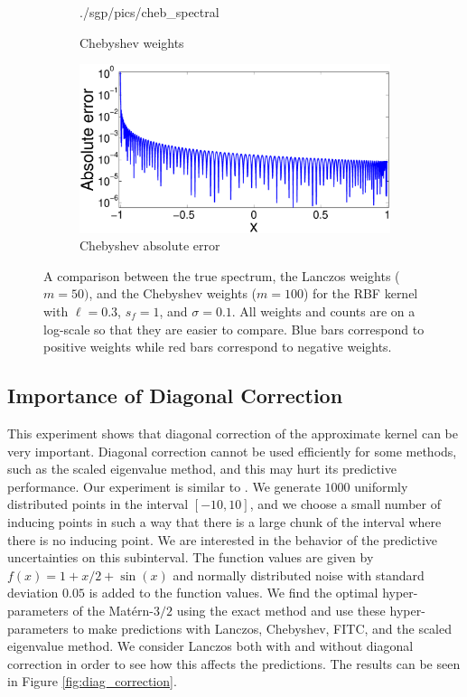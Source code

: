\begin{figure}[ht]
\begin{center}
\begin{subfigure}{0.46\textwidth}
      {./sgp/pics/cheb_spectral}
      \caption{Chebyshev weights}
      \label{fig:cheb_spectral}
    \end{subfigure}
    \begin{subfigure}{0.46\textwidth}
      \centering
      \includegraphics[width=\textwidth,trim=0cm 0cm 2.5cm 0.5cm,clip]
      {./sgp/pics/cheb_err}
      \caption{Chebyshev absolute error}
      \label{fig:cheb_err}
    \end{subfigure}
    \caption{A comparison between the true spectrum, the Lanczos weights 
    ($m=50)$, and the Chebyshev weights ($m=100$) for the RBF kernel with
    $\ell=0.3$, $s_f=1$, and $\sigma=0.1$. All weights and counts are on a
    log\hyp{}scale so that they are easier to compare. Blue bars correspond to
    positive weights while red bars correspond to negative weights.}
    \label{fig:spectrum}
  \end{center}
\end{figure}

\subsection{Importance of Diagonal Correction}
\label{sup:diagcorrectionimportance}

This experiment shows that diagonal correction of the approximate kernel can be
very important. Diagonal correction cannot be used efficiently for some methods,
such as the scaled eigenvalue method, and this may hurt its predictive
performance. Our experiment is similar to \citep{quinonero2005unifying}.  We
generate $1000$ uniformly distributed points in the interval $[-10,10]$, and we
choose a small number of inducing points in such a way that there is a large
chunk of the interval where there is no inducing point. We are interested in the
behavior of the predictive uncertainties on this subinterval. The function
values are given by $f(x) = 1 + x/2 + \sin(x)$ and normally distributed noise
with standard deviation $0.05$ is added to the function values. We find the
optimal hyper\hyp{}parameters of the Mat\'ern\hyp{}$3/2$ using the exact method
and use these hyper\hyp{}parameters to make predictions with Lanczos, Chebyshev,
FITC, and the scaled eigenvalue method. We consider Lanczos both with and
without diagonal correction in order to see how this affects the predictions.
The results can be seen in Figure \ref{fig:diag_correction}.

